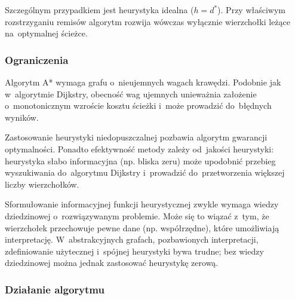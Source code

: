 \documentclass[11pt,a4paper,oneside]{report}
\begin{document}
Szczególnym przypadkiem jest heurystyka idealna ($h = d^*$). Przy właściwym rozstrzyganiu remisów algorytm rozwija wówczas wyłącznie wierzchołki leżące na~optymalnej ścieżce.

\subsubsection{Ograniczenia}

Algorytm A* wymaga grafu o~nieujemnych wagach krawędzi. Podobnie jak w~algorytmie Dijkstry, obecność wag ujemnych unieważnia założenie o~monotonicznym wzroście kosztu ścieżki i~może prowadzić do~błędnych wyników.

Zastosowanie heurystyki niedopuszczalnej pozbawia algorytm gwarancji optymalności. Ponadto efektywność metody zależy od~jakości heurystyki: heurystyka słabo informacyjna (np. bliska zeru) może upodobnić przebieg wyszukiwania do~algorytmu Dijkstry i~prowadzić do~przetworzenia większej liczby wierzchołków.

Sformułowanie informacyjnej funkcji heurystycznej zwykle wymaga wiedzy dziedzinowej o~rozwiązywanym problemie. Może się to wiązać z~tym, że wierzchołek przechowuje pewne dane (np. współrzędne), które umożliwiają interpretację. W~abstrakcyjnych grafach, pozbawionych interpretacji, zdefiniowanie użytecznej i~spójnej heurystyki bywa trudne; bez wiedzy dziedzinowej można jednak zastosować heurystykę zerową.

\subsubsection{Działanie algorytmu}
\end{document}
